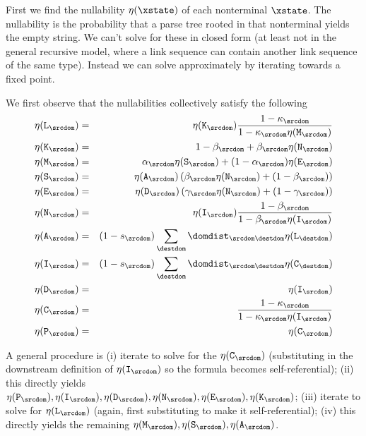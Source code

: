 First we find the nullability
$\nullability(\xstate)$ of each nonterminal $\xstate$.
The nullability is the probability that a parse tree rooted in that nonterminal
yields the empty string.
We can't solve for these in closed form (at least not in the general recursive
model, where a link sequence can contain another link sequence of the same type).
Instead we can solve approximately by iterating towards a fixed point.

We first observe that the nullabilities collectively satisfy the following
\begin{eqnarray*}
    \nullability(\ntlinks_\srcdom) & = & \nullability(\ntimm_\srcdom) \frac{1 - \kappa_\srcdom}{1 - \kappa_\srcdom \nullability(\ntmor_\srcdom)} \\
    \nullability(\ntimm_\srcdom) & = & 1 - \beta_\srcdom + \beta_\srcdom \nullability(\ntnew_\srcdom) \\
    \nullability(\ntmor_\srcdom) & = & \alpha_\srcdom \nullability(\ntsur_\srcdom) + (1 - \alpha_\srcdom) \nullability(\ntexp_\srcdom) \\
    \nullability(\ntsur_\srcdom) & = & \nullability(\ntaln_\srcdom) \left( \beta_\srcdom \nullability(\ntnew_\srcdom) + (1 - \beta_\srcdom) \right) \\
    \nullability(\ntexp_\srcdom) & = & \nullability(\ntdel_\srcdom) \left( \gamma_\srcdom \nullability(\ntnew_\srcdom) + (1 - \gamma_\srcdom) \right) \\
    \nullability(\ntnew_\srcdom) & = & \nullability(\ntins_\srcdom) \frac{1 - \beta_\srcdom}{1 - \beta_\srcdom \nullability(\ntins_\srcdom)}  \\
    \nullability(\ntaln_\srcdom) & = & (1 - \tok_\srcdom) \sum_\destdom \domdist_{\srcdom\destdom} \nullability(\ntlinks_\destdom) \\
    \nullability(\ntins_\srcdom) & = & (1 - \tok_\srcdom)\sum_\destdom \domdist_{\srcdom\destdom} \nullability(\ntchild_\destdom) \\
    \nullability(\ntdel_\srcdom) & = & \nullability(\ntins_\srcdom) \\
    \nullability(\ntchild_\srcdom) & = & \frac{1 - \kappa_\srcdom}{1 - \kappa_\srcdom \nullability(\ntins_\srcdom)} \\
    \nullability(\ntparent_\srcdom) & = & \nullability(\ntchild_\srcdom) \\    
\end{eqnarray*}

A general procedure is (i) iterate to solve for the $\nullability(\ntchild_\srcdom)$ (substituting in the downstream definition of $\nullability(\ntins_\srcdom)$ so the formula becomes self-referential);
(ii) this directly yields $\nullability(\ntparent_\srcdom), \nullability(\ntins_\srcdom), \nullability(\ntdel_\srcdom), \nullability(\ntnew_\srcdom), \nullability(\ntexp_\srcdom), \nullability(\ntimm_\srcdom)$;
(iii) iterate to solve for $\nullability(\ntlinks_\srcdom)$ (again, first substituting to make it self-referential);
(iv) this directly yields the remaining $\nullability(\ntmor_\srcdom), \nullability(\ntsur_\srcdom), \nullability(\ntaln_\srcdom)$.

